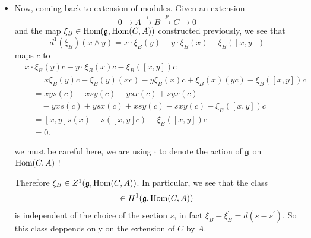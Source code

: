 \begin{itemize}
\item Now, coming back to extension of modules. Given an extension
\begin{equation}
    0\to A\overset{i}{\to}B\overset{p}{\to}C\to0
\end{equation}
 and the map 
$\xi_B\in\text{Hom}(\mathfrak{g},\text{Hom}(C,A))$ constructed previously, we see that 
\begin{equation}
    d^1(\xi_B)(x\wedge y)=x\cdot\xi_B(y)-y\cdot\xi_B(x)-\xi_B([x,y])
\end{equation}
maps $c$ to 
\begin{equation}
    \begin{split}
        &x\cdot\xi_B(y)c-y\cdot\xi_B(x)c-\xi_B([x,y])c\\
        &\quad= x\xi_B(y)c-\xi_B(y)(xc)-y\xi_B(x)c+\xi_B(x)(yc)-\xi_B([x,y])c\\
        &\quad= xys(c)-xsy(c)-ysx(c)+syx(c)\\
        &\quad\quad-yxs(c)+ysx(c)+xsy(c)-sxy(c)-\xi_B([x,y])c\\
        &\quad=[x,y]s(x)-s([x,y]c)-\xi_B([x,y])c\\
        &\quad=0.
    \end{split}
\end{equation}
\begin{dang}
    \begin{remark}
        we must be careful here, we are using $\cdot$ to denote the action of $\mathfrak{g}$ on $\text{Hom}(C,A)$ !
    \end{remark}
\end{dang}

Therefore $\xi_B\in Z^1(\mathfrak{g},\text{Hom}(C,A))$. In particular, we see that the class
\begin{equation}
    [\xi_B]\in H^1(\fr{g},\Hom(C,A))
\end{equation}
is independent of the choice of the section $s$, in fact $\xi_B-\xi_B^\prime = d(s-s^\prime)$. 
So this class deppends only on the extension of $C$ by $A$.
\end{itemize}

